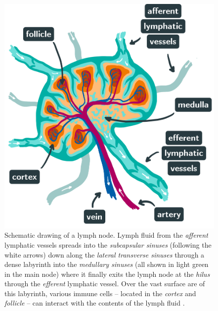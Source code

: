 \documentclass[\relativeRoot/main.tex]{subfiles}
\begin{document}
\begin{figure}
    \begin{minipage}[c]{0.6\textwidth}
        \includegraphics[width=\textwidth]{figures/lymph-node_labelled.png}
    \end{minipage}
    \hfill
    \begin{minipage}[c]{0.38\textwidth}
        \caption[
            Lymph node schematic
        ]{
            Schematic drawing of a lymph node. Lymph fluid from the \emph{afferent} lymphatic vessels spreads into the \emph{subcapsular sinuses} (following the white arrows) down along the \emph{lateral transverse sinuses} through a dense labyrinth into the \emph{medullary sinuses} (all shown in light green in the main node) where it finally exits the lymph node at the \emph{hilus} through the \emph{efferent} lymphatic vessel. Over the vast surface are of this labyrinth, various immune cells -- located in the \emph{cortex} and \emph{follicle} -- can interact with the contents of the lymph fluid \cite{willard-mack_normal_2006,ohtani_structure_2008}.
        }
    \end{minipage}
    \label{fig:intro:lymph-node}
\end{figure}
\end{document}
